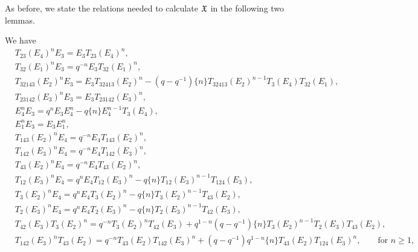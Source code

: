 \documentclass[a4 paper, 10pt]{article}
\begin{document}
As before, we state the relations needed to calculate $\mathfrak{X}$ in the following two lemmas.

\begin{lemma}
We have
\begin{align*}
&	T_{23}(E_4)^nE_3		=	E_3T_{23}(E_4)^n,\\
&	T_{32}(E_1)^nE_3		=	q^{-n}E_3T_{32}(E_1)^n,\\
&	T_{32143}(E_2)^nE_3	=	E_3T_{32413}(E_2)^n - (q-q^{-1})\{n \}T_{32413}(E_2)^{n-1}T_3(E_4)T_{32}(E_1),\\
&	T_{23142}(E_3)^nE_3	=	E_3T_{23142}(E_3)^n,\\
&	E_4^nE_3				=	q^nE_3E_4^n - q\{n \}E_4^{n-1}T_3(E_4),\\
&	E_1^nE_3				=	E_3E_1^n,\\
&	T_{143}(E_2)^nE_4	=	q^{-n}E_4T_{143}(E_2)^n,\\
&	T_{142}(E_3)^nE_4	=	q^{-n}E_4T_{142}(E_3)^n,\\
&	T_{43}(E_2)^nE_4		=	q^{-n}E_4T_{43}(E_2)^n,\\
&	T_{12}(E_3)^nE_4		=	q^nE_4T_{12}(E_3)^n - q\{n \}T_{12}(E_3)^{n-1}T_{124}(E_3),\\
&	T_3(E_2)^nE_4		=	q^nE_4T_3(E_2)^n - q\{n \}T_3(E_2)^{n-1}T_{43}(E_2),\\
&	T_2(E_3)^nE_4		=	q^nE_4T_2(E_3)^n - q\{n \}T_2(E_3)^{n-1}T_{42}(E_3),\\
&	T_{42}(E_3)T_3(E_2)^n	=	q^{-n}T_3(E_2)^nT_{42}(E_3) + q^{1-n}(q-q^{-1})\{n \}T_3(E_2)^{n-1}T_2(E_3)T_{43}(E_2),\\
&	T_{142}(E_3)^nT_{43}(E_2)	=	q^{-n}T_{43}(E_2)T_{142}(E_3)^n + (q-q^{-1})q^{1-n}\{n\}T_{43}(E_2)T_{124}(E_3)^n, \qquad \mbox{for $n \geq 1$,}\\
\end{align*}
\end{lemma}
\end{document}
